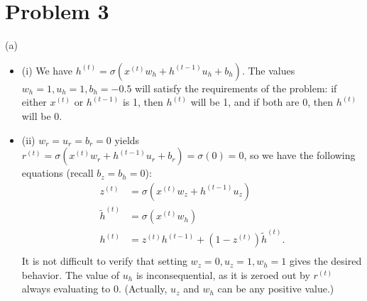 \documentclass{article}
\begin{document}
\section{Problem 3}
(a)
\begin{itemize}
\item (i) We have $h^{(t)} = \sigma(x^{(t)}w_h + h^{(t-1)}u_h + b_h)$. The values $w_h = 1, u_h = 1, b_h = -0.5$ will satisfy the requirements of the problem: if either $x^{(t)}$ or $h^{(t-1)}$ is 1, then $h^{(t)}$ will be 1, and if both are 0, then $h^{(t)}$ will be 0.
\item (ii) $w_r = u_r = b_r = 0$ yields $r^{(t)} = \sigma(x^{(t)}w_r + h^{(t-1)}u_r + b_r) = \sigma(0) = 0$, so we have the following equations (recall $b_z = b_h = 0$):
\begin{align*}
z^{(t)} &= \sigma(x^{(t)}w_z + h^{(t-1)}u_z) \\
\tilde{h}^{(t)} &= \sigma(x^{(t)}w_h) \\
h^{(t)} &= z^{(t)} h^{(t-1)} + (1 - z^{(t)}) \tilde{h}^{(t)}. \\
\end{align*}
It is not difficult to verify that setting $w_z = 0, u_z = 1, w_h = 1$ gives the desired behavior. The value of $u_h$ is inconsequential, as it is zeroed out by $r^{(t)}$ always evaluating to 0. (Actually, $u_z$ and $w_h$ can be any positive value.)
\end{itemize}
\end{document}
